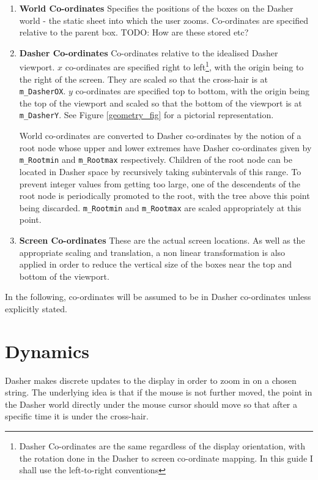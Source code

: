 \documentclass{article}
\begin{document}
\begin{enumerate}
\item {\bf World Co-ordinates} Specifies the positions of the boxes on the Dasher world - the static sheet into which the user zooms. Co-ordinates are specified relative to the parent box. TODO: How are these stored etc?
\item {\bf Dasher Co-ordinates} Co-ordinates relative to the idealised Dasher viewport. $x$ co-ordinates are specified right to left\footnote{Dasher Co-ordinates are the same regardless of the display orientation, with the rotation done in the Dasher to screen co-ordinate mapping. In this guide I shall use the left-to-right conventions}, with the origin being to the right of the screen. They are scaled so that the cross-hair is at {\tt m\_DasherOX}. $y$ co-ordinates are specified top to bottom, with the origin being the top of the viewport and scaled so that the bottom of the viewport is at {\tt m\_DasherY}. See Figure \ref{geometry_fig} for a pictorial representation.

World co-ordinates are converted to Dasher co-ordinates by the notion of a root node whose upper and lower extremes have Dasher co-ordinates given by {\tt m\_Rootmin} and {\tt m\_Rootmax} respectively. Children of the root node can be located in Dasher space by recursively taking subintervals of this range. To prevent integer values from getting too large, one of the descendents of the root node is periodically promoted to the root, with the tree above this point being discarded. {\tt m\_Rootmin} and {\tt m\_Rootmax} are scaled appropriately at this point.

\item {\bf Screen Co-ordinates} These are the actual screen locations. As well as the appropriate scaling and translation, a non linear transformation is also applied in order to reduce the vertical size of the boxes near the top and bottom of the viewport.

\end{enumerate}

In the following, co-ordinates will be assumed to be in Dasher co-ordinates unless explicitly stated.

\section{Dynamics}

Dasher makes discrete updates to the display in order to zoom in on a chosen string. The underlying idea is that if the mouse is not further moved, the point in the Dasher world directly under the mouse cursor should move so that after a specific time it is under the cross-hair. 
\end{document}
